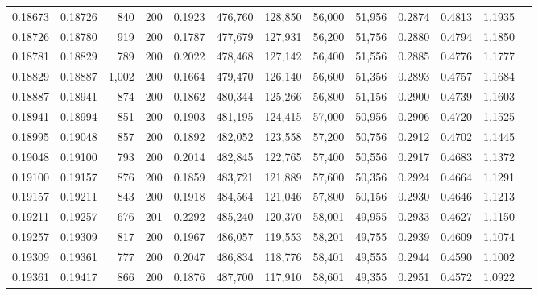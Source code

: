 \begin{tabular}{rrrrrrrrrrrrr}
0.18673 & 0.18726 &   840 & 200 &                                     0.1923 & 476,760 & 128,850 &  56,000 &  51,956 & 0.2874 & 0.4813 & 1.1935 \\
0.18726 & 0.18780 &   919 & 200 &                                     0.1787 & 477,679 & 127,931 &  56,200 &  51,756 & 0.2880 & 0.4794 & 1.1850 \\
0.18781 & 0.18829 &   789 & 200 &                                     0.2022 & 478,468 & 127,142 &  56,400 &  51,556 & 0.2885 & 0.4776 & 1.1777 \\
0.18829 & 0.18887 & 1,002 & 200 &                                     0.1664 & 479,470 & 126,140 &  56,600 &  51,356 & 0.2893 & 0.4757 & 1.1684 \\
0.18887 & 0.18941 &   874 & 200 &                                     0.1862 & 480,344 & 125,266 &  56,800 &  51,156 & 0.2900 & 0.4739 & 1.1603 \\
0.18941 & 0.18994 &   851 & 200 &                                     0.1903 & 481,195 & 124,415 &  57,000 &  50,956 & 0.2906 & 0.4720 & 1.1525 \\
0.18995 & 0.19048 &   857 & 200 &                                     0.1892 & 482,052 & 123,558 &  57,200 &  50,756 & 0.2912 & 0.4702 & 1.1445 \\
0.19048 & 0.19100 &   793 & 200 &                                     0.2014 & 482,845 & 122,765 &  57,400 &  50,556 & 0.2917 & 0.4683 & 1.1372 \\
0.19100 & 0.19157 &   876 & 200 &                                     0.1859 & 483,721 & 121,889 &  57,600 &  50,356 & 0.2924 & 0.4664 & 1.1291 \\
0.19157 & 0.19211 &   843 & 200 &                                     0.1918 & 484,564 & 121,046 &  57,800 &  50,156 & 0.2930 & 0.4646 & 1.1213 \\
0.19211 & 0.19257 &   676 & 201 &                                     0.2292 & 485,240 & 120,370 &  58,001 &  49,955 & 0.2933 & 0.4627 & 1.1150 \\
0.19257 & 0.19309 &   817 & 200 &                                     0.1967 & 486,057 & 119,553 &  58,201 &  49,755 & 0.2939 & 0.4609 & 1.1074 \\
0.19309 & 0.19361 &   777 & 200 &                                     0.2047 & 486,834 & 118,776 &  58,401 &  49,555 & 0.2944 & 0.4590 & 1.1002 \\
0.19361 & 0.19417 &   866 & 200 &                                     0.1876 & 487,700 & 117,910 &  58,601 &  49,355 & 0.2951 & 0.4572 & 1.0922 \\

\end{tabular}
